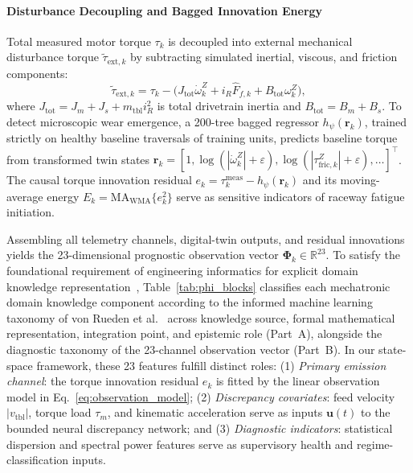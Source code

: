 \documentclass[a4paper,fleqn]{cas-dc}
\newcommand{\bPhi}{\bm{\Phi}}
\newcommand{\R}{\mathbb{R}}
\begin{document}
\paragraph{Disturbance Decoupling and Bagged Innovation Energy}
Total measured motor torque $\tau_k$ is decoupled into external mechanical disturbance torque $\tilde{\tau}_{\mathrm{ext},k}$ by subtracting simulated inertial, viscous, and friction components:
\begin{equation}
    \tilde{\tau}_{\mathrm{ext},k} = \tau_k - \bigl(J_{\mathrm{tot}} \dot{\omega}_k^Z + i_R \hat{F}_{f,k} + B_{\mathrm{tot}} \omega_k^Z\bigr),
    \label{eq:dist_torque}
\end{equation}
where $J_{\mathrm{tot}} = J_m + J_s + m_{\mathrm{tbl}} i_R^2$ is total drivetrain inertia and $B_{\mathrm{tot}} = B_m + B_s$. To detect microscopic wear emergence, a 200-tree bagged regressor $h_\psi(\mathbf{r}_k)$, trained strictly on healthy baseline traversals of training units, predicts baseline torque from transformed twin states $\mathbf{r}_k = [1, \log(|\dot{\omega}_k^Z|+\varepsilon), \log(|\tau_{\mathrm{fric},k}^Z|+\varepsilon), \dots]^\top$. The causal torque innovation residual $e_k = \tau_k^{\mathrm{meas}} - h_\psi(\mathbf{r}_k)$ and its moving-average energy $E_k = \mathrm{MA}_{\mathrm{WMA}}\{e_k^2\}$ serve as sensitive indicators of raceway fatigue initiation.

Assembling all telemetry channels, digital-twin outputs, and residual innovations yields the 23-dimensional prognostic observation vector $\bPhi_k \in \R^{23}$. To satisfy the foundational requirement of engineering informatics for explicit domain knowledge representation~\cite{Liao_2023, D_He_2025}, Table~\ref{tab:phi_blocks} classifies each mechatronic domain knowledge component according to the informed machine learning taxonomy of von Rueden et al.~\cite{vonRueden_2023} across knowledge source, formal mathematical representation, integration point, and epistemic role (Part~A), alongside the diagnostic taxonomy of the 23-channel observation vector (Part~B). In our state-space framework, these 23 features fulfill distinct roles: (1) \emph{Primary emission channel}: the torque innovation residual $e_k$ is fitted by the linear observation model in Eq.~\eqref{eq:observation_model}; (2) \emph{Discrepancy covariates}: feed velocity $|v_{\mathrm{tbl}}|$, torque load $\tau_m$, and kinematic acceleration serve as inputs $\mathbf{u}(t)$ to the bounded neural discrepancy network; and (3) \emph{Diagnostic indicators}: statistical dispersion and spectral power features serve as supervisory health and regime-classification inputs.
\end{document}
